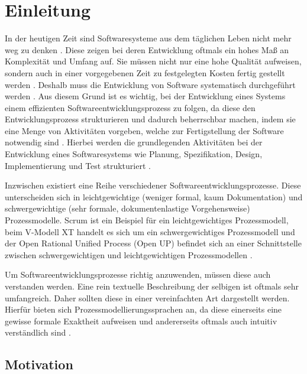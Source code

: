 \chapter{Einleitung}\label{sec:chapter1}

In der heutigen Zeit sind Softwaresysteme aus dem täglichen Leben nicht mehr weg zu denken \cite{Puntambekar2007}. Diese zeigen bei deren Entwicklung oftmals ein hohes Maß an Komplexität und Umfang auf. Sie müssen nicht nur eine hohe Qualität aufweisen, sondern auch in einer vorgegebenen Zeit zu festgelegten Kosten fertig gestellt werden \cite{Grechenig2010}. Deshalb muss die Entwicklung von Software systematisch durchgeführt werden \cite{gumm2012einfuhrung}. Aus diesem Grund ist es wichtig, bei der Entwicklung eines Systems einem effizienten Softwareentwicklungsprozess zu folgen, da diese den Entwicklungsprozess strukturieren und dadurch beherrschbar machen, indem sie eine Menge von Aktivitäten vorgeben, welche zur Fertigstellung der Software notwendig sind \cite{richling2011autonomie}. Hierbei werden die grundlegenden Aktivitäten bei der Entwicklung eines Softwaresystems wie Planung, Spezifikation, Design, Implementierung und Test strukturiert \cite{gumm2012einfuhrung, Hanser2010}. \newline

Inzwischen existiert eine Reihe verschiedener Softwareentwicklungsprozesse. Diese unterscheiden sich in leichtgewichtige (weniger formal, kaum Dokumentation) und schwergewichtige (sehr formale, dokumentenlastige Vorgehensweise) Prozessmodelle. Scrum ist ein Beispiel für ein leichtgewichtiges Prozessmodell, beim V-Modell XT handelt es sich um ein schwergewichtiges Prozessmodell und der Open Rational Unified Process (Open UP) befindet sich an einer Schnittstelle zwischen schwergewichtigen und leichtgewichtigen Prozessmodellen \cite{Hanser2010}.\newline

Um Softwareentwicklungsprozesse richtig anzuwenden, müssen diese auch verstanden werden. Eine rein textuelle Beschreibung der selbigen ist oftmals sehr umfangreich. Daher sollten diese in einer vereinfachten Art dargestellt werden. Hierfür bieten sich Prozessmodellierungssprachen an, da diese einerseits eine gewisse formale Exaktheit aufweisen und andererseits oftmals auch intuitiv verständlich sind \cite{thomas2009,kircher2006}. \newline

\section{Motivation}



